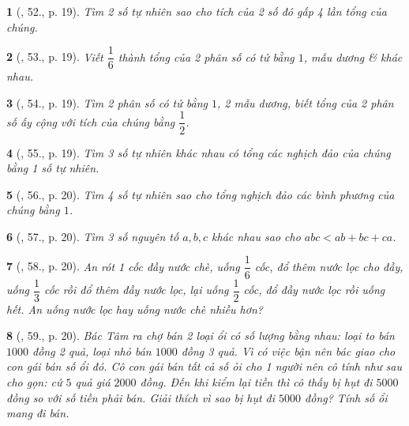 \documentclass{article}
\newtheorem{baitoan}{}
\begin{document}
\begin{baitoan}[\cite{Binh_Toan_6_tap_2}, 52., p. 19]
	Tìm 2 số tự nhiên sao cho tích của 2 số đó gấp 4 lần tổng của chúng.
\end{baitoan}

\begin{baitoan}[\cite{Binh_Toan_6_tap_2}, 53., p. 19]
	Viết $\dfrac{1}{6}$ thành tổng của 2 phân số có tử bằng $1$, mẫu dương \& khác nhau.
\end{baitoan}

\begin{baitoan}[\cite{Binh_Toan_6_tap_2}, 54., p. 19]
	Tìm 2 phân số có tử bằng $1$, 2 mẫu dương, biết tổng của 2 phân số ấy cộng với tích của chúng bằng $\dfrac{1}{2}$.
\end{baitoan}

\begin{baitoan}[\cite{Binh_Toan_6_tap_2}, 55., p. 19]
	Tìm 3 số tự nhiên khác nhau có tổng các nghịch đảo của chúng bằng 1 số tự nhiên.
\end{baitoan}

\begin{baitoan}[\cite{Binh_Toan_6_tap_2}, 56., p. 20]
	Tìm 4 số tự nhiên sao cho tổng nghịch đảo các bình phương của chúng bằng $1$.
\end{baitoan}

\begin{baitoan}[\cite{Binh_Toan_6_tap_2}, 57., p. 20]
	Tìm 3 số nguyên tố $a,b,c$ khác nhau sao cho $abc < ab + bc + ca$.
\end{baitoan}

\begin{baitoan}[\cite{Binh_Toan_6_tap_2}, 58., p. 20]
	An rót 1 cốc đầy nước chè, uống $\dfrac{1}{6}$ cốc, đổ thêm nước lọc cho đầy, uống $\dfrac{1}{3}$ cốc rồi đổ thêm đầy nước lọc, lại uống $\dfrac{1}{2}$ cốc, đổ đầy nước lọc rồi uống hết. An uống nước lọc hay uống nước chè nhiều hơn?
\end{baitoan}

\begin{baitoan}[\cite{Binh_Toan_6_tap_2}, 59., p. 20]
	Bác Tâm ra chợ bán 2 loại ổi có số lượng bằng nhau: loại to bán $1000$ đồng 2 quả, loại nhỏ bán $1000$ đồng 3 quả. Vì có việc bận nên bác giao cho con gái bán số ổi đó. Cô con gái bán tất cả số ỏi cho 1 người nên cô tính như sau cho gọn: cứ $5$ quả giá $2000$ đồng. Đến khi kiểm lại tiền thì cô thấy bị hụt đi $5000$ đồng so với số tiền phải bán. Giải thích vì sao bị hụt đi $5000$ đồng? Tính số ổi mang đi bán.
\end{baitoan}
\end{document}
